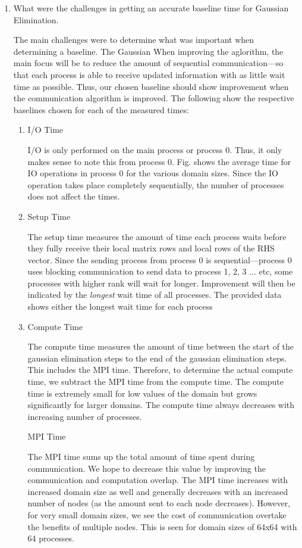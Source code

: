 \documentclass{article}
\begin{document}
\begin{enumerate}
\item What were the challenges in getting an accurate baseline time for Gaussian Elimination.

The main challenges were to determine what was important when determining a baseline. The Gaussian When improving the aglorithm, the main focus will be to reduce the amount of sequential communication---so that each process is able to receive updated information with as little wait time as possible. Thus, our chosen baseline should show improvement when the communication algorithm is improved. The following show the respective baselines chosen for each of the measured times:
\begin{enumerate}
	\item I/O Time

	I/O is only performed on the main process or process 0. Thus, it only makes sense to note this from process 0. Fig. shows the average time for IO operations in process 0 for the various domain sizes. Since the IO operation takes place completely sequentially, the number of processes does not affect the times. 

	\item Setup Time

	The setup time measures the amount of time each process waits before they fully receive their local matrix rows and local rows of the RHS vector. Since the sending process from process 0 is sequential---process 0 uses blocking communication to send data to process 1, 2, 3 ... etc, some processes with higher rank will wait for longer. Improvement will then be indicated by the \textit{longest} wait time of all processes. The provided data shows either the longest wait time for each process
	
	\item Compute Time
	
	The compute time measures the amount of time between the start of the gaussian elimination steps to the end of the gaussian elimination steps. This includes the MPI time. Therefore, to determine the actual compute time, we subtract the MPI time from the compute time. The compute time is extremely small for low values of the domain but grows significantly for larger domains. The compute time always decreases with increasing number of processes.
	
	\time MPI Time
	
	The MPI time sums up the total amount of time spent during communication. We hope to decrease this value by improving the communication and computation overlap. The MPI time increases with increased domain size as well and generally decreases with an increased number of nodes (as the amount sent to each node decreases). However, for very small domain sizes, we see the cost of communication overtake the benefits of multiple nodes. This is seen for domain sizes of 64x64 with 64 processes.
	


\end{enumerate}
\end{enumerate}
\end{document}
